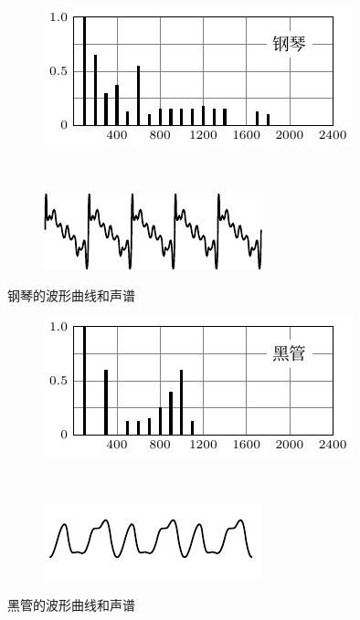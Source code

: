 \begin{figure}[htbp]
    \centering
    \begin{minipage}[b]{0.48\textwidth}
        \centering
        \begin{subfigure}{0.8\linewidth}
            \centering
            \includegraphics{fig/A/9-33a.pdf}
            \caption{}\label{fig_A_9-33a}
        \end{subfigure}
        \\
        \begin{subfigure}{0.8\linewidth}
            \centering
            \includegraphics{fig/A/9-33b.pdf}
            \caption{}\label{fig_A_9-33b}
        \end{subfigure}
        \caption{钢琴的波形曲线和声谱}\label{fig_A_9-33}
    \end{minipage}
    \begin{minipage}[b]{0.48\textwidth}
        \centering
        \begin{subfigure}{0.8\linewidth}
            \centering
            \includegraphics{fig/A/9-34a.pdf}
            \caption{}\label{fig_A_9-34a}
        \end{subfigure}
        \\
        \begin{subfigure}{0.8\linewidth}
            \centering
            \includegraphics{fig/A/9-34b.pdf}
            \caption{}\label{fig_A_9-34b}
        \end{subfigure}
        \caption{黑管的波形曲线和声谱}\label{fig_A_9-34}
    \end{minipage}
\end{figure}



